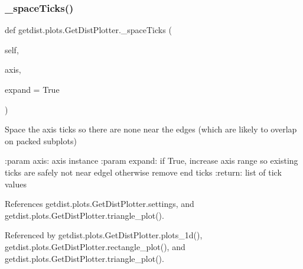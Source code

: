 \subsubsection{\texorpdfstring{\+\_\+space\+Ticks()}{\_spaceTicks()}}
{\footnotesize\ttfamily def getdist.\+plots.\+Get\+Dist\+Plotter.\+\_\+space\+Ticks (\begin{DoxyParamCaption}\item[{}]{self,  }\item[{}]{axis,  }\item[{}]{expand = {\ttfamily True} }\end{DoxyParamCaption})\hspace{0.3cm}{\ttfamily [private]}}

\begin{DoxyVerb}Space the axis ticks so there are none near the edges (which are likely to overlap on packed subplots)

:param axis: axis instance
:param expand: if True, increase axis range so existing ticks are safely not near edgel
        otherwise remove end ticks
:return: list of tick values
\end{DoxyVerb}
 

References getdist.\+plots.\+Get\+Dist\+Plotter.\+settings, and getdist.\+plots.\+Get\+Dist\+Plotter.\+triangle\+\_\+plot().



Referenced by getdist.\+plots.\+Get\+Dist\+Plotter.\+plots\+\_\+1d(), getdist.\+plots.\+Get\+Dist\+Plotter.\+rectangle\+\_\+plot(), and getdist.\+plots.\+Get\+Dist\+Plotter.\+triangle\+\_\+plot().

